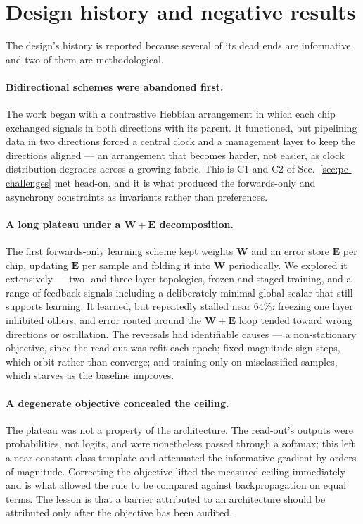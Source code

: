 \documentclass[11pt]{article}
\newcommand{\W}{\bm W}
\newcommand{\E}{\bm E}
\begin{document}
\section{Design history and negative results}\label{sec:history}

The design's history is reported because several of its dead ends are informative and two of them are
methodological.

\paragraph{Bidirectional schemes were abandoned first.} The work began with a contrastive Hebbian
arrangement in which each chip exchanged signals in both directions with its parent. It functioned,
but pipelining data in two directions forced a central clock and a management layer to keep the
directions aligned --- an arrangement that becomes harder, not easier, as clock distribution degrades
across a growing fabric. This is C1 and C2 of Sec.~\ref{sec:pc-challenges} met head-on, and it is what
produced the forwards-only and asynchrony constraints as invariants rather than preferences.

\paragraph{A long plateau under a $\W{+}\E$ decomposition.} The first forwards-only learning scheme
kept weights $\W$ and an error store $\E$ per chip, updating $\E$ per sample and folding it into $\W$
periodically. We explored it extensively --- two- and three-layer topologies, frozen and staged
training, and a range of feedback signals including a deliberately minimal global scalar that still
supports learning. It learned, but repeatedly stalled near $64\%$: freezing one layer inhibited
others, and error routed around the $\W{+}\E$ loop tended toward wrong directions or oscillation.
The reversals had identifiable causes --- a non-stationary objective, since the read-out was refit
each epoch; fixed-magnitude sign steps, which orbit rather than converge; and training only on
misclassified samples, which starves as the baseline improves.

\paragraph{A degenerate objective concealed the ceiling.} The plateau was not a property of the
architecture. The read-out's outputs were probabilities, not logits, and were nonetheless passed
through a softmax; this left a near-constant class template and attenuated the informative gradient by
orders of magnitude. Correcting the objective lifted the measured ceiling immediately and is what
allowed the rule to be compared against backpropagation on equal terms. The lesson is that a barrier
attributed to an architecture should be attributed only after the objective has been audited.
\end{document}
